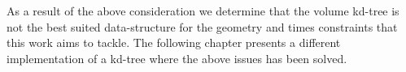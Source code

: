 As a result of the above consideration we determine that the volume kd-tree is not the best suited data-structure for the geometry and times constraints that this work aims to tackle. The following chapter presents a different implementation of a kd-tree where the above issues has been solved.\\




